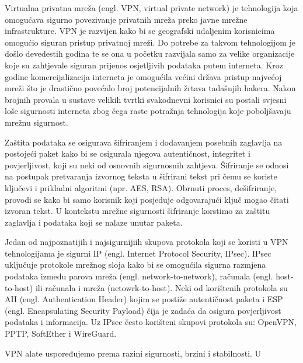 
	Virtualna privatna mreža (engl. VPN, virtual private network) je tehnologija koja omogućava sigurno povezivanje privatnih mreža preko javne mrežne infrastrukture. VPN je razvijen kako bi se geografski udaljenim korisnicima omogućio siguran pristup privatnoj mreži.\cite{cis} Do potrebe za takvom tehnologijom je došlo devedestih godina te se ona u početku razvijala samo za velike organizacije koje su zahtjevale siguran prijenos osjetljivih podataka putem interneta. Kroz godine komercijalizacija interneta je omogućila većini država pristup najvećoj mreži što je drastično povećalo broj potencijalnih žrtava tadašnjih hakera. Nakon brojnih provala u sustave velikih tvrtki svakodnevni korisnici su postali svjesni loše sigurnosti interneta zbog čega raste potražnja tehnologija koje poboljšavaju mrežnu sigurnost.
 \bigbreak
	
Zaštita podataka se osigurava šifriranjem i dodavanjem posebnih zaglavlja na postojeći paket kako bi se osigurala njegova  autentičnost, integritet i povjerljivost, koji su neki od osnovnih sigurnosnih zahtjeva. Šifriranje se odnosi na  postupak pretvaranja izvornog teksta u šifrirani tekst pri čemu se koriste ključevi i prikladni algoritmi (npr. AES, RSA). Obrnuti proces, dešifriranje, provodi se kako bi samo korisnik koji posjeduje odgovarajući ključ mogao čitati izvoran tekst. U kontekstu mrežne sigurnosti šifriranje korstimo za zaštitu zaglavlja i podataka koji se nalaze unutar paketa.\cite{fundamentals} 
\bigbreak

Jedan od najpoznatijih i najsigurnijiih skupova protokola koji se koristi u VPN tehnologijama je sigurni IP (engl. Internet Protocol Security, IPsec). IPsec uključuje protokole mrežnog sloja kako bi se omogućila sigurna razmjena podataka između parova mreža (engl. network-to-network), računala (engl. host-to-host) ili računala i mreža (netowrk-to-host). Neki od korištenih protokola su AH (engl. Authentication Header) kojim se postiže autentičnost paketa i ESP (engl. Encapsulating Security Payload) čija je zadaća da osigura povjerljivost podataka i informacija. Uz IPsec često korišteni skupovi protokola su: OpenVPN, PPTP, SoftEther i WireGuard. 
\bigbreak
 
VPN alate uspoređujemo prema razini sigurnosti, brzini i stabilnosti. U 

